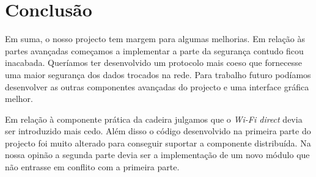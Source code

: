 \section{Conclusão}
Em suma, o nosso projecto tem margem para algumas melhorias. Em relação às partes avançadas começamos a implementar a parte da segurança contudo ficou inacabada. Queríamos ter desenvolvido um protocolo mais coeso que fornecesse uma maior segurança dos dados trocados na rede. Para trabalho futuro podíamos desenvolver as outras componentes avançadas do projecto e uma interface gráfica melhor.

Em relação à componente prática da cadeira julgamos que o \textit{Wi-Fi direct} devia ser introduzido mais cedo. Além disso o código desenvolvido na primeira parte do projecto foi muito alterado para conseguir suportar a componente distribuída. Na nossa opinão a segunda parte devia ser a implementação de um novo módulo que não entrasse em conflito com a primeira parte. 